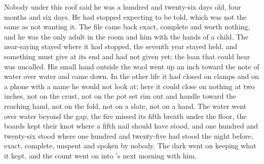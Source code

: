 Nobody under this roof said he was a hundred and twenty-six days old, four months and six days. He had stopped expecting to be told, which was not the same as not wanting it. The file came back exact, complete and worth nothing, and he was the only adult in the room and him with the hands of a child. The near-saying stayed where it had stopped, the seventh year stayed held, and something must give at its end and had not given yet; the loan that could hear was uncalled. His small hand outside the wool went up an inch toward the note of water over water and came down. In the other life it had closed on clamps and on a phone with a name he would not look at; here it could close on nothing at two inches, not on the crust, not on the pot set rim out and handle toward the reaching hand, not on the fold, not on a slate, not on a hand. The water went over water beyond the gap, the fire missed its fifth breath under the floor, the boards kept their knot where a fifth nail should have stood, and one hundred and twenty-six stood where one hundred and twenty-five had stood the night before, exact, complete, unspent and spoken by nobody. The dark went on keeping what it kept, and the count went on into 's next morning with him.
